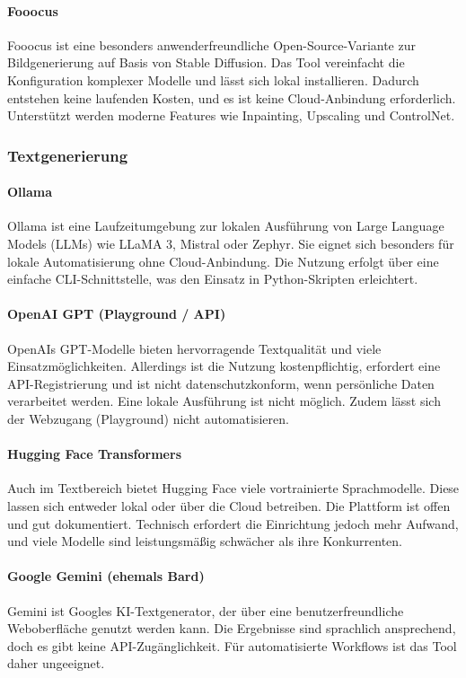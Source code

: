 \documentclass[a4paper,12pt]{article}
\begin{document}
\paragraph{Fooocus}
Fooocus ist eine besonders anwenderfreundliche Open-Source-Variante zur Bildgenerierung auf Basis von Stable Diffusion. Das Tool vereinfacht die Konfiguration komplexer Modelle und lässt sich lokal installieren. Dadurch entstehen keine laufenden Kosten, und es ist keine Cloud-Anbindung erforderlich. Unterstützt werden moderne Features wie Inpainting, Upscaling und ControlNet.

\subsubsection{Textgenerierung}

\paragraph{Ollama}
Ollama ist eine Laufzeitumgebung zur lokalen Ausführung von Large Language Models (LLMs) wie LLaMA 3, Mistral oder Zephyr. Sie eignet sich besonders für lokale Automatisierung ohne Cloud-Anbindung. Die Nutzung erfolgt über eine einfache CLI-Schnittstelle, was den Einsatz in Python-Skripten erleichtert.

\paragraph{OpenAI GPT (Playground / API)}
OpenAIs GPT-Modelle bieten hervorragende Textqualität und viele Einsatzmöglichkeiten. Allerdings ist die Nutzung kostenpflichtig, erfordert eine API-Registrierung und ist nicht datenschutzkonform, wenn persönliche Daten verarbeitet werden. Eine lokale Ausführung ist nicht möglich. Zudem lässt sich der Webzugang (Playground) nicht automatisieren.

\paragraph{Hugging Face Transformers}
Auch im Textbereich bietet Hugging Face viele vortrainierte Sprachmodelle. Diese lassen sich entweder lokal oder über die Cloud betreiben. Die Plattform ist offen und gut dokumentiert. Technisch erfordert die Einrichtung jedoch mehr Aufwand, und viele Modelle sind leistungsmäßig schwächer als ihre Konkurrenten.

\paragraph{Google Gemini (ehemals Bard)}
Gemini ist Googles KI-Textgenerator, der über eine benutzerfreundliche Weboberfläche genutzt werden kann. Die Ergebnisse sind sprachlich ansprechend, doch es gibt keine API-Zugänglichkeit. Für automatisierte Workflows ist das Tool daher ungeeignet.
\end{document}
